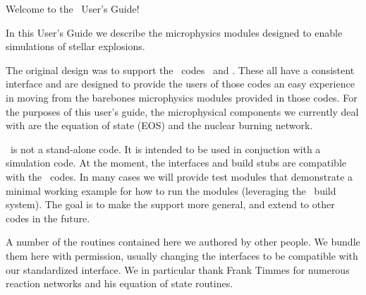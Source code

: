 
Welcome to the \microphysics\ User's Guide!

In this User's Guide we describe the microphysics modules designed to
enable simulations of stellar explosions.  

The original design was to support the \amrex\ codes \castro\ and
\maestro. These all have a consistent interface and are designed to
provide the users of those codes an easy experience in moving from the
barebones microphysics modules provided in those codes. For the
purposes of this user's guide, the microphysical components we
currently deal with are the equation of state (EOS) and the nuclear
burning network.

\microphysics\ is not a stand-alone code. It is intended to be used in
conjuction with a simulation code.  At the moment, the interfaces and
build stubs are compatible with the \amrex\ codes.  In many cases we
will provide test modules that demonstrate a minimal working example
for how to run the modules (leveraging the \amrex\ build system).  The 
goal is to make the support more general, and extend to other codes
in the future.

A number of the routines contained here we authored by other people.
We bundle them here with permission, usually changing the interfaces
to be compatible with our standardized interface.  We in particular
thank Frank Timmes for numerous reaction networks and his equation
of state routines.
